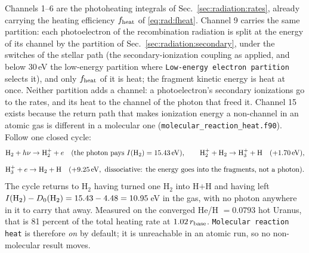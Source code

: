 Channels 1--6 are the photoheating integrals of
Sec.~\ref{sec:radiation:rates}, already carrying the heating efficiency
$f_{\rm heat}$ of \eqref{eq:rad:fheat}. Channel 9 carries the same
partition: each photoelectron of the recombination radiation is split at
the energy of its channel by the partition of
Sec.~\ref{sec:radiation:secondary}, under the switches of the stellar path
(the secondary-ionization coupling as applied, and below 30\,eV the
low-energy partition where \texttt{Low-energy electron partition} selects
it), and only $f_{\rm heat}$ of it is heat; the fragment kinetic energy is
heat at once. Neither partition adds a channel: a photoelectron's
secondary ionizations go to the rates, and its heat to the channel of the
photon that freed it. Channel 15 exists because the return
path that makes ionization energy a non-channel in an atomic gas is different
in a molecular one (\texttt{molecular\_reaction\_heat.f90}). Follow one
closed cycle:
\[
{\rm H_2}+h\nu \to {\rm H_2^+}+e \quad(\text{the photon pays }
I({\rm H_2})=15.43\,{\rm eV}),
\qquad
{\rm H_2^+}+{\rm H_2}\to{\rm H_3^+}+{\rm H} \quad(+1.70\,{\rm eV}),
\]
\[
{\rm H_3^+}+e \to {\rm H_2}+{\rm H}\quad(+9.25\,{\rm eV},\ \text{dissociative:
the energy goes into the fragments, not a photon}).
\]
The cycle returns to H$_2$ having turned one H$_2$ into H$+$H and having left
$I({\rm H_2})-D_0({\rm H_2}) = 15.43-4.48 = 10.95$\,eV in the gas, with no
photon anywhere in it to carry that away. Measured on the converged
He/H $=0.0793$ hot Uranus, that is 81 percent of the total heating rate at
$1.02\,r_{\rm base}$. \texttt{Molecular reaction heat} is therefore
\emph{on} by default; it is unreachable in an atomic run, so no non-molecular
result moves.

